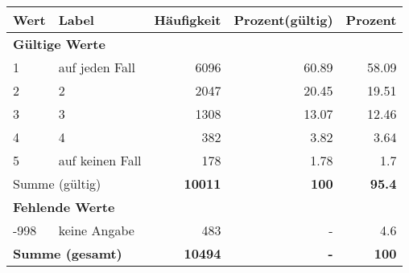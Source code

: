     \begin{longtable}{lXrrr}
     \toprule
     \textbf{Wert} & \textbf{Label} & \textbf{Häufigkeit} & \textbf{Prozent(gültig)} & \textbf{Prozent} \\
     \endhead
     \midrule
     \multicolumn{5}{l}{\textbf{Gültige Werte}}\\

     1 &
     \multicolumn{1}{X}{ auf jeden Fall   } &


       \num{6096} &
       \num[round-mode=places,round-precision=2]{60.89} &
         \num[round-mode=places,round-precision=2]{58.09} \\

     2 &
     \multicolumn{1}{X}{ 2   } &


       \num{2047} &
       \num[round-mode=places,round-precision=2]{20.45} &
         \num[round-mode=places,round-precision=2]{19.51} \\

     3 &
     \multicolumn{1}{X}{ 3   } &


       \num{1308} &
       \num[round-mode=places,round-precision=2]{13.07} &
         \num[round-mode=places,round-precision=2]{12.46} \\

     4 &
     \multicolumn{1}{X}{ 4   } &


       \num{382} &
       \num[round-mode=places,round-precision=2]{3.82} &
         \num[round-mode=places,round-precision=2]{3.64} \\

     5 &
     \multicolumn{1}{X}{ auf keinen Fall   } &


       \num{178} &
       \num[round-mode=places,round-precision=2]{1.78} &
         \num[round-mode=places,round-precision=2]{1.7} \\
     \midrule
     \multicolumn{2}{l}{Summe (gültig)} &
       \textbf{\num{10011}} &
     \textbf{\num{100}} &
       \textbf{\num[round-mode=places,round-precision=2]{95.4}} \\
     \multicolumn{5}{l}{\textbf{Fehlende Werte}}\\
       -998 &
       keine Angabe &
         \num{483} &
        - &
         \num[round-mode=places,round-precision=2]{4.6} \\
     \midrule
     \multicolumn{2}{l}{\textbf{Summe (gesamt)}} &
          \textbf{\num{10494}} &
        \textbf{-} &
        \textbf{\num{100}} \\
     \bottomrule
     \end{longtable}
     
